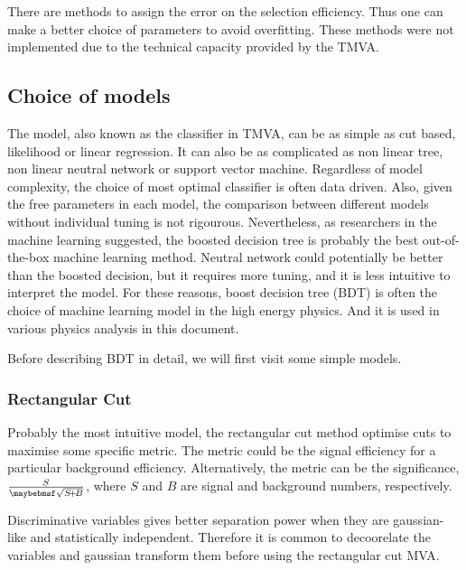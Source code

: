There are methods to assign the error on the selection efficiency. Thus one can make a better choice of parameters to avoid overfitting. These methods were not implemented due to the technical capacity provided by the TMVA.

\subsection{Choice of models}

The model, also known as the classifier in TMVA, can be as simple as cut based, likelihood or linear regression. It can also be as complicated as non linear tree, non linear neutral network or support vector machine. Regardless of model complexity, the choice of most optimal classifier is often data driven. Also, given the free parameters in each model, the comparison between different models without individual tuning is not rigourous. Nevertheless, as researchers in the machine learning suggested, the boosted decision tree is probably the best out-of-the-box machine learning method. Neutral network could potentially be better than the boosted decision, but it requires more tuning, and it is less intuitive to interpret the model. For these reasons, boost decision tree (BDT) is often the choice of machine learning model in the high energy physics. And it is used in various physics analysis in this document.

Before describing BDT in detail, we will first visit some simple models.




\subsubsection{Rectangular Cut}

Probably the most intuitive model, the rectangular cut method optimise cuts to maximise some specific metric. The metric could be the signal efficiency for a particular background efficiency. Alternatively, the metric can be the significance, $\frac{S}{\rootOf{S\!+\!B}}$, where $S$ and $B$ are signal and background numbers, respectively.

Discriminative variables gives better separation power when they are gaussian-like and statistically independent. Therefore it is common to decoorelate  the variables and gaussian transform them before using the rectangular cut MVA.

